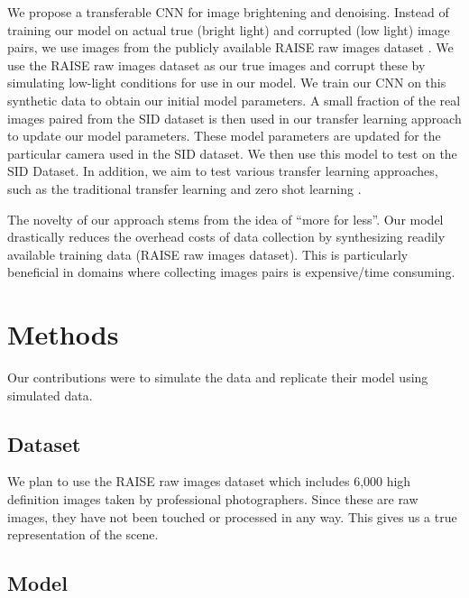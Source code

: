 \documentclass{article}
\begin{document}
We propose a transferable CNN for image brightening and denoising. Instead
of training our model on actual true (bright light) and corrupted
(low light) image pairs, we use images from the publicly available
RAISE raw images dataset \cite{Dang-Nguyen:2015:RRI:2713168.2713194}. We
use the RAISE raw images dataset as our true images and corrupt these by
simulating low-light conditions for use in our model. We train our CNN on
this synthetic
data to obtain our initial model parameters. A small fraction of the real
images paired from the SID dataset is then used in our transfer learning
\cite{Goodfellow-et-al-2016} approach to update our model parameters.
These model parameters are updated for the particular camera used in the
SID dataset. We then use this model to test on the SID Dataset. In
addition, we aim to test various transfer learning approaches, such as the
traditional transfer learning and zero shot learning \cite{larochelle2008, NIPS2009_3650,socher2013zeroshot}. \newline

The novelty of our approach stems from the idea of ``more for less''. Our
model drastically reduces the overhead costs of data collection by
synthesizing readily available training data (RAISE raw images dataset).
This is
particularly beneficial in domains where collecting images pairs is
expensive/time consuming.

\section{Methods}

Our contributions were to simulate the data and replicate their model
using simulated data.

\subsection{Dataset}

We plan to use the RAISE raw images dataset which includes 6,000 high
definition images taken by professional photographers. Since these are
raw images, they have not been touched or processed in any way. This gives
us a true representation of the scene. 

\subsection{Model}
\end{document}

